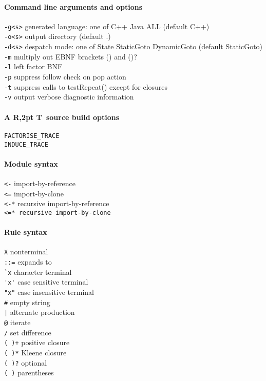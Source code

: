 \documentclass[11pt]{article}
\newcommand{\art}{{\rm A\kern -2pt R\kern -2,2pt T}}
\begin{document}
\paragraph{Command line arguments and options}
\verb+-g<s>+ generated language: one of C++ Java ALL (default C++)\\
\verb+-o<s>+ output directory (default .)\\
\verb+-d<s>+ despatch mode: one of State StaticGoto DynamicGoto (default StaticGoto)\\
\verb+-m+    multiply out EBNF brackets () and ()?\\
\verb+-l+    left factor BNF\\
\verb+-p+    suppress follow check on pop action\\
\verb+-t+    suppress calls to testRepeat() except for closures\\
\verb+-v+    output verbose diagnostic information

\paragraph{\art\ source build options}
\verb+FACTORISE_TRACE+\\
\verb+INDUCE_TRACE+

\paragraph{Module syntax}
\verb+<-+ import-by-reference\\
\verb+<=+ import-by-clone\\
\verb+<-*+ recursive import-by-reference\\
\verb+<=* recursive import-by-clone+

\paragraph{Rule syntax}
\verb+X+ nonterminal\\
\verb+::=+ expands to\\
\verb+`x+ character terminal\\
\verb+'x'+ case sensitive terminal\\
\verb+"x"+ case insensitive terminal\\
\verb+#+ empty string\\
\verb+|+ alternate production\\
\verb+@+ iterate\\
\verb+/+ set difference\\
\verb!( )+! positive closure\\
\verb+( )*+ Kleene closure\\
\verb+( )?+ optional\\
\verb+( )+ parentheses
\end{document}
